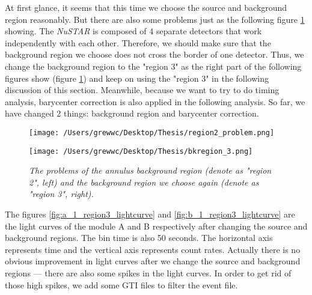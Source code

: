 \documentclass[12pt]{report}
\newcommand{\mycaption}[1]{\caption{\textit{\footnotesize #1}}}
\begin{document}
        \indent At first glance, it seems that this time we choose the source and background region reasonably. But 
        there %
        are also some problems just as the following figure \ref{fig:problems} showing. The \textit{NuSTAR} is 
        composed of 4 separate detectors that work independently with each other. Therefore, we should make sure that
        the background region we choose does not cross the border of one detector. Thus, we change the background 
        region to the "region 3" as the right part of the following figures show (figure
        \ref{fig:problems}) and keep on using the "region 3" in the following discussion of this section. Meanwhile,
        because we want to try to do timing analysis, barycenter correction is also applied in the following 
        analysis. So far, we have changed 2 things: background region and barycenter correction. 

        \begin{figure}[!ht]
          \begin{minipage}{0.45\textwidth}
            \begin{center} 
                \texttt{[image: /Users/grewwc/Desktop/Thesis/region2\_problem.png]}
            \end{center}
            \end{minipage}
          \begin{minipage}{0.45\textwidth}
            \begin{center}
            \texttt{[image: /Users/grewwc/Desktop/Thesis/bkregion\_3.png]}
            \end{center}
          \end{minipage}
          \centering
          \begin{minipage}{0.8\textwidth}
            \mycaption{The problems of the annulus background region (denote as "region 2", \textit{left}) and the 
            background region we choose again (denote as "region 3", \textit{right}).}
          \label{fig:problems}
          \end{minipage}
        \end{figure}

        \indent The figures \ref{fig:a_1_region3_lightcurve} and \ref{fig:b_1_region3_lightcurve} are the light 
        curves 
        of the module A and B respectively after changing the source and background regions. The bin time is 
        also 50 seconds. The horizontal axis represents time and the vertical axis represents count rates. 
        Actually there is no obvious improvement in light curves after we change the source and background regions
        --- there are also some spikes in the light curves. In order to get rid of those high spikes, we add some 
        GTI files to filter the event file. 
\end{document}
